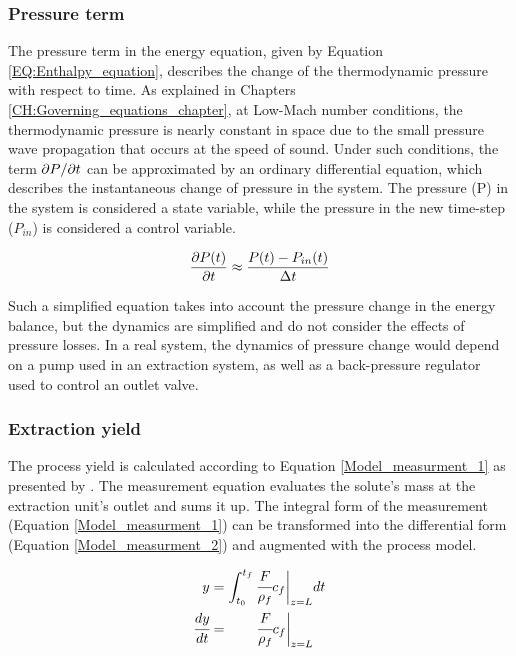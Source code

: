 \documentclass[../Article_Model_Parameters.tex]{subfiles}
\begin{document}
		\subsubsection{Pressure term} \label{CH: Pressure}
		
		The pressure term in the energy equation, given by Equation \ref{EQ:Enthalpy_equation}, describes the change of the thermodynamic pressure with respect to time. As explained in Chapters \ref{CH:Governing_equations_chapter}, at Low-Mach number conditions, the thermodynamic pressure is nearly constant in space due to the small pressure wave propagation that occurs at the speed of sound. Under such conditions, the term $\partial {\color{black}P}/\partial t$ can be approximated by an ordinary differential equation, which describes the instantaneous change of pressure in the system. The pressure (P) in the system is considered a state variable, while the pressure in the new time-step ($P_{in}$) is considered a control variable.
		
		{\footnotesize
			\begin{equation}
				\frac{\partial {\color{black}P}(t)}{\partial t} \approx \frac{{\color{black}P}(t) - {\color{black}P_{in}}(t) }{\Delta t}
		\end{equation}}
		
		Such a simplified equation takes into account the pressure change in the energy balance, but the dynamics are simplified and do not consider the effects of pressure losses. In a real system, the dynamics of pressure change would depend on a pump used in an extraction system, as well as a back-pressure regulator used to control an outlet valve.
  		
  		\fi
  		
		\subsubsection{Extraction yield} \label{CH: Yield}
			
		The process yield is calculated according to Equation \ref{Model_measurment_1} as presented by \citet{Sovova1994a}. The measurement equation evaluates the solute's mass at the extraction unit's outlet and sums it up. The integral form of the measurement (Equation \ref{Model_measurment_1}) can be transformed into the differential form (Equation \ref{Model_measurment_2}) and augmented with the process model.
			
		{\footnotesize
			\begin{align} 
				\label{Model_measurment_1}
				y &= \int_{t_0}^{t_f} \cfrac{F}{\rho_f} c_f \biggr\rvert_{z=L} dt \\
				\cfrac{dy}{dt} &= \qquad \cfrac{F}{\rho_f} c_f \biggr\rvert_{z=L} 
                \label{Model_measurment_2}
		\end{align}	}
  
\end{document}
